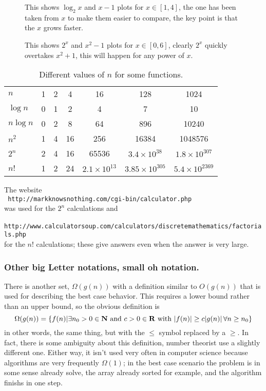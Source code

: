 \documentclass[11pt,a4paper]{scrartcl}
\begin{document}
\begin{figure}

\caption{This shows $\log_2{x}$ and $x-1$ plots for $x\in[1,4]$, the one has been taken from $x$ to make them easier to compare, the key point is that the $x$ grows faster.\label{fig_log}}
\end{figure}


\begin{figure}

\caption{This shows $2^x$ and $x^2-1$ plots for $x\in[0,6]$, clearly $2^x$ quickly overtakes $x^2+1$, this will happen for any power of $x$. \label{fig_log}}
\end{figure}

\begin{table}
\begin{tabular}{l|cccccc}
        $n$    &1   &2&4   &16  &128&1024\\
$\log{n}$      &0   &1&2   &4   &7  &10\\
$n\log{n}$     &0   &2&8   &64  &896&10240\\
$n^2$     &1   &4&16&256&16384&1048576\\
$2^n$     &2   &4&16&65536&$3.4\times 10^{38}$&$1.8\times 10^{307}$\\
$n!$      &1   &2&24&$2.1\times 10^{13}$&$3.85\times 10^{305}$&$5.4\times10^{2369}$
\end{tabular}
\vskip 1cm The website\\ {\tt
  http://markknowsnothing.com/cgi-bin/calculator.php}\\ was used for
the $2^n$ calculations and\\ {\tt
  http://www.calculatorsoup.com/calculators/discretemathematics/factorials.php}\\ for
the $n!$ calculations; these give answers even when the answer is very
large.

\caption{Different values of $n$ for some functions.  \label{table_n_values}
}
\end{table}

\subsubsection*{Other big Letter notations, small oh notation.}

There is another set, $\Omega(g(n))$ with a definition similar to
$O(g(n))$ that is used for describing the best case behavior. This
requires a lower bound rather than an upper bound, so the obvious
definition is
\begin{equation}
\Omega(g(n))=\{f(n)| \exists n_0>0\in {\bf N}\mbox{ and }c>0\in {\bf R}\mbox{ with }|f(n)|\ge c|g(n)|\,\forall n\ge n_0\}
\end{equation}
in other words, the same thing, but with the $\le$ symbol replaced by
a $\ge$. In fact, there is some ambiguity about this definition,
number theorist use a slightly different one. Either way, it isn't
used very often in computer science because algorithms are very
frequently $\Omega(1)$; in the best case scenario the problem is in
some sense already solve, the array already sorted for example, and
the algorithm finishs in one step. 
\end{document}
